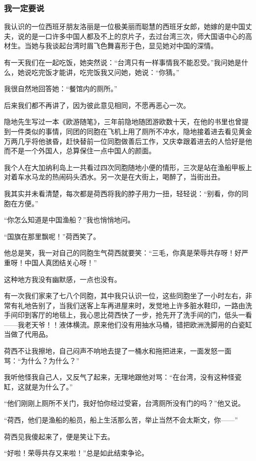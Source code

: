 \subsubsection*{我一定要说}
\par 我认识的一位西班牙朋友洛丽是一位极美丽而聪慧的西班牙女郎，她嫁的是中国丈夫，说的是一口许多中国人都及不上的京片子，去过台湾三次，师大国语中心的高材生。当她与我谈起台湾时眉飞色舞喜形于色，显见她对中国的深情。
\par 有一天我们在一起吃饭，她突然说：“台湾只有一样事情我不能忍受。”我问她是什么，她说吃完饭才能讲，吃完饭我又问她，她说：“你猜。”
\par 我很自然地回答她：“餐馆内的厕所。”
\par 后来我们都不再讲了，因为彼此意见相同，不愿再恶心一次。
\par 隐地先生写过一本《欧游随笔》，三年前隐地随团游欧数十天，在他的书里也曾提到一件类似的事情，同团的同胞在飞机上用了厕所不冲水，隐地接着进去看见黄金万两几乎将他骇昏，赶快替前一位同胞做善后工作，又庆幸跟着进去的人恰好是他而不是一个外国人，总算保住一点中国人的颜面。
\par 我个人在大加纳利岛上一共看过四次同胞随地小便的情形，三次是站在渔船甲板上对着车水马龙的热闹码头洒水。另一次是在大街上，喝醉了，当街出丑。
\par 我其实并未看清楚，每次都是荷西将我的脖子用力一扭，轻轻说：“别看，你的同胞在方便。”
\par “你怎么知道是中国渔船？”我也悄悄地问。
\par “国旗在那里飘呢！”荷西笑了。
\par 他总是笑，我一对自己的同胞生气荷西就要笑：“三毛，你真是荣辱共存呀！好严重呀！中国人真团结关心呀！”
\par 这种地方我没有幽默感，一点也没有。
\par 有一次我们家来了七八个同胞，其中我只认识一位，这些同胞坐了一小时左右，非常有礼地告别了，当我们送客上车再进屋来时，发觉地上许多脏水鞋印，一路由洗手间印到客厅的地毯上，我心思比荷西快了一步，抢先开了洗手间的门，低头一看——我老天爷！！液体横流。原来他们没有用抽水马桶，错把欧洲洗脚用的白瓷缸当做了代用品。
\par 荷西不让我擦地，自己闷声不响地去提了一桶水和拖把进来，一面发怒一面骂：“为什么？为什么？”
\par 我听他怪我自己人，又反气了起来，无理地跟他对骂：“在台湾，没有这种怪瓷缸，这就是为什么了。”
\par “他们刚刚上厕所不关门，我好怕你经过受窘，台湾厕所没有门的吗？”他又说。
\par “荷西，他们是渔船的船员，船上生活那么苦，举止当然不会太斯文，你——”
\par 荷西见我傻起来了，便是笑让下去。
\par “好啦！荣辱共存又来啦！”总是如此结束争论。
